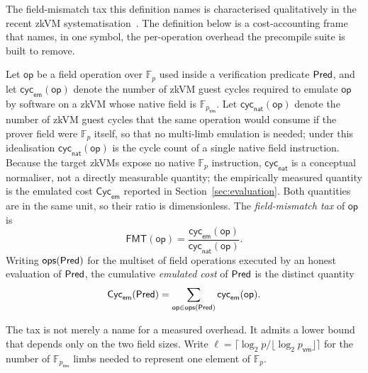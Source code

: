 The field-mismatch tax this definition names is characterised qualitatively in the recent zkVM systematisation~\cite{yang2026sokzkvm}. The definition below is a cost-accounting frame that names, in one symbol, the per-operation overhead the precompile suite is built to remove.
\begin{definition}\label{def:fmt}
Let $\mathsf{op}$ be a field operation over $\mathbb{F}_p$ used inside a verification predicate $\mathsf{Pred}$, and let $\mathsf{cyc}_{\mathsf{em}}(\mathsf{op})$ denote the number of zkVM guest cycles required to emulate $\mathsf{op}$ by software on a zkVM whose native field is $\mathbb{F}_{p_{\mathsf{vm}}}$. Let $\mathsf{cyc}_{\mathsf{nat}}(\mathsf{op})$ denote the number of zkVM guest cycles that the same operation would consume if the prover field were $\mathbb{F}_p$ itself, so that no multi-limb emulation is needed; under this idealisation $\mathsf{cyc}_{\mathsf{nat}}(\mathsf{op})$ is the cycle count of a single native field instruction. Because the target zkVMs expose no native $\mathbb{F}_p$ instruction, $\mathsf{cyc}_{\mathsf{nat}}$ is a conceptual normaliser, not a directly measurable quantity; the empirically measured quantity is the emulated cost $\mathsf{Cyc}_{\mathsf{em}}$ reported in Section~\ref{sec:evaluation}. Both quantities are in the same unit, so their ratio is dimensionless. The \emph{field-mismatch tax} of $\mathsf{op}$ is
\begin{equation*}
  \mathsf{FMT}(\mathsf{op})
  =
  \frac{\mathsf{cyc}_{\mathsf{em}}(\mathsf{op})}{\mathsf{cyc}_{\mathsf{nat}}(\mathsf{op})}.
\end{equation*}
Writing $\mathsf{ops}(\mathsf{Pred})$ for the multiset of field operations executed by an honest evaluation of $\mathsf{Pred}$, the cumulative \emph{emulated cost} of $\mathsf{Pred}$ is the distinct quantity
\begin{equation*}
  \mathsf{Cyc}_{\mathsf{em}}(\mathsf{Pred})
  =
  \sum_{\mathsf{op}\in\mathsf{ops}(\mathsf{Pred})}
  \mathsf{cyc}_{\mathsf{em}}(\mathsf{op}).
\end{equation*}
\end{definition}

The tax is not merely a name for a measured overhead. It admits a lower bound that depends only on the two field sizes. Write $\ell = \lceil \log_2 p / \lfloor \log_2 p_{\mathsf{vm}}\rfloor \rceil$ for the number of $\mathbb{F}_{p_{\mathsf{vm}}}$ limbs needed to represent one element of $\mathbb{F}_p$.


